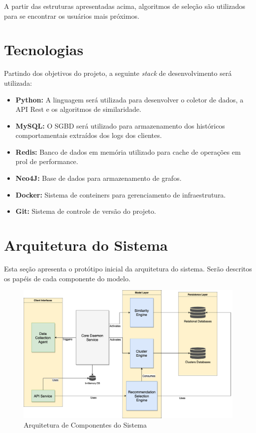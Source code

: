 \documentclass[
	12pt,				%
    oneside,			%
	a4paper,			%
	english,			%
	french,				%
	spanish,			%
	brazil,				%
	]{abntex2}
\begin{document}
A partir das estruturas apresentadas acima, algoritmos de seleção são utilizados para se encontrar os usuários mais próximos.

\section{Tecnologias}
Partindo dos objetivos do projeto, a seguinte \textit{stack} de desenvolvimento será utilizada:

\begin{itemize}
	\item \textbf{Python:} A linguagem será utilizada para desenvolver o coletor de dados, a API Rest e os algoritmos de similaridade.
	\item \textbf{MySQL:} O SGBD será utilizado para armazenamento dos históricos comportamentais extraídos dos logs dos clientes.
	\item \textbf{Redis:} Banco de dados em memória utilizado para cache de operações em prol de performance.
	\item \textbf{Neo4J:} Base de dados para armazenamento de grafos.
	\item \textbf{Docker:} Sistema de conteiners para gerenciamento de infraestrutura.
	\item \textbf{Git:} Sistema de controle de versão do projeto.
\end{itemize}

\section{Arquitetura do Sistema}
Esta seção apresenta o protótipo inicial da arquitetura do sistema. Serão descritos os papéis de cada componente do modelo.
\begin{figure}[hbt]
	\label{Arquitetura de Componentes do Sistema}
	\caption{Arquitetura de Componentes do Sistema}
	\includegraphics[width=160mm]{system-architecture.png}
\end{figure}
 
\end{document}
